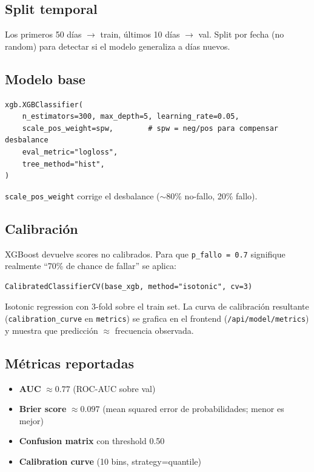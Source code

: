 \documentclass[11pt,a4paper]{article}
\begin{document}
\subsection{Split temporal}

Los primeros 50 días $\rightarrow$ train, últimos 10 días $\rightarrow$ val. Split por fecha (no random) para detectar si el modelo generaliza a días nuevos.

\subsection{Modelo base}

\begin{lstlisting}[language=pyplus]
xgb.XGBClassifier(
    n_estimators=300, max_depth=5, learning_rate=0.05,
    scale_pos_weight=spw,        # spw = neg/pos para compensar desbalance
    eval_metric="logloss",
    tree_method="hist",
)
\end{lstlisting}

\texttt{scale\_pos\_weight} corrige el desbalance ($\sim$80\% no-fallo, 20\% fallo).

\subsection{Calibración}

XGBoost devuelve scores no calibrados. Para que \texttt{p\_fallo = 0.7} signifique realmente ``70\% de chance de fallar'' se aplica:

\begin{lstlisting}[language=pyplus]
CalibratedClassifierCV(base_xgb, method="isotonic", cv=3)
\end{lstlisting}

Isotonic regression con 3-fold sobre el train set. La curva de calibración resultante (\texttt{calibration\_curve} en \texttt{metrics}) se grafica en el frontend (\texttt{/api/model/metrics}) y muestra que predicción $\approx$ frecuencia observada.

\subsection{Métricas reportadas}

\begin{itemize}
  \item \textbf{AUC} $\approx 0.77$ (ROC-AUC sobre val)
  \item \textbf{Brier score} $\approx 0.097$ (mean squared error de probabilidades; menor es mejor)
  \item \textbf{Confusion matrix} con threshold 0.50
  \item \textbf{Calibration curve} (10 bins, strategy=quantile)
\end{itemize}
\end{document}
